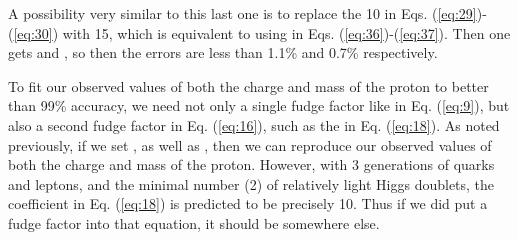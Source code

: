\documentclass[a4paper,12pt]{article}
\begin{document}
	A possibility very similar to this last one is to
replace the 10 in Eqs. (\ref{eq:29})-(\ref{eq:30}) with 15, which is
equivalent to using \coordHE{} in
Eqs. (\ref{eq:36})-(\ref{eq:37}).  Then
one gets \coordHE{}
and \coordHE{},
so then the errors are less than 1.1\% and 0.7\% respectively.

	To fit our observed values
of both the charge and mass of the proton to better than 99\% accuracy,
we need not only a single fudge factor like \coordHE{} in Eq. (\ref{eq:9}),
but also a second fudge factor in Eq. (\ref{eq:16}),
such as the \coordHE{} in Eq. (\ref{eq:18}).
As noted previously, if we set \coordHE{},
as well as \coordHE{}, then we can reproduce
our observed values of both the charge and mass of the proton.
However, with 3 generations of quarks and leptons,
and the minimal number (2) of relatively light Higgs doublets,
the coefficient \coordHE{} in Eq. (\ref{eq:18}) is predicted to be precisely 10.
Thus if we did put a fudge factor into that equation,
it should be somewhere else.
\end{document}
